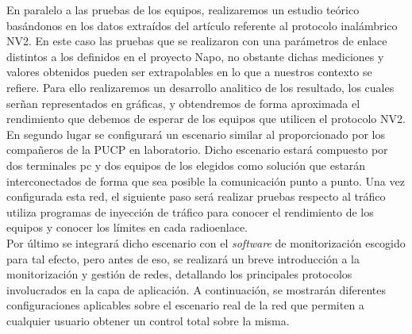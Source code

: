 En paralelo a las pruebas de los equipos, realizaremos un estudio teórico basándonos en los datos extraídos del artículo \cite{simo2014assessing} referente al protocolo inalámbrico NV2. En este caso las pruebas que se realizaron con una parámetros de enlace distintos a los definidos en el proyecto Napo, no obstante dichas mediciones y valores obtenidos pueden ser extrapolables en lo que a nuestros contexto se refiere. Para ello realizaremos un desarrollo analitico de los resultado, los cuales serñan representados en gráficas, y obtendremos de forma aproximada el rendimiento que debemos de esperar de los equipos que utilicen el protocolo NV2. \\

En segundo lugar se configurará un escenario similar al proporcionado por los compañeros de la PUCP en laboratorio. Dicho escenario estará compuesto por dos terminales pc y dos equipos de los elegidos como solución que estarán interconectados de forma que sea posible la comunicación punto a punto. Una vez configurada esta red, el siguiente paso será realizar pruebas respecto al tráfico utiliza programas de inyección de tráfico para conocer el rendimiento de los equipos y conocer los límites en cada radioenlace.\\

Por último se integrará dicho escenario con el \textit{software} de monitorización escogido para tal efecto, pero antes de eso, se realizará un breve introducción a la monitorización y gestión de redes, detallando los principales protocolos involucrados en la capa de aplicación. A continuación, se mostrarán diferentes configuraciones aplicables sobre el escenario real de la red que permiten a cualquier usuario obtener un control total sobre la misma.

